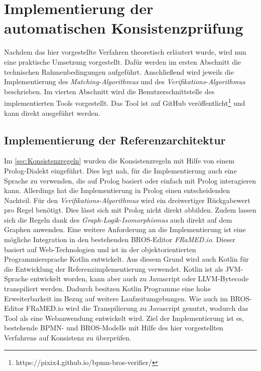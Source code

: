\chapter{Implementierung der automatischen Konsistenzprüfung}
\label{chap:implementation}

Nachdem das hier vorgestellte Verfahren theoretisch erläutert wurde, wird nun eine praktische Umsetzung vorgestellt.
Dafür werden im ersten Abschnitt die technischen Rahmenbedingungen aufgeführt.
Anschließend wird jeweils die Implementierung des \emph{Matching-Algorithmus} und des \emph{Verifikations-Algorithmus} beschrieben.
Im vierten Abschnitt wird die Benutzerschnittstelle des implementierten Tools vorgestellt.
Das Tool ist auf GitHub veröffentlicht\footnote{https://pixix4.github.io/bpmn-bros-verifier/} und kann direkt ausgeführt werden.

\section{Implementierung der Referenzarchitektur}

Im \cref{sec:Konsistenzregeln} wurden die Konsistenzregeln mit Hilfe von einem Prolog-Dialekt eingeführt.
Dies legt nah, für die Implementierung auch eine Sprache zu verwenden, die auf Prolog basiert oder einfach mit Prolog interagieren kann.
Allerdings hat die Implementierung in Prolog einen entscheidenden Nachteil.
Für den \emph{Verifikations-Algorithmus} wird ein dreiwertiger Rückgabewert pro Regel benötigt.
Dies lässt sich mit Prolog nicht direkt abbilden.
Zudem lassen sich die Regeln dank des \emph{Graph-Logik-Isomorphismus} auch direkt auf dem Graphen anwenden.
Eine weitere Anforderung an die Implementierung ist eine mögliche Integration in den bestehenden BROS-Editor \emph{FRaMED.io}.
Dieser basiert auf Web-Technologien und ist in der objektorientierten Programmiersprache Kotlin entwickelt.
Aus diesem Grund wird auch Kotlin für die Entwicklung der Referenzimplementierung verwendet.
Kotlin ist als JVM-Sprache entwickelt worden, kann aber auch zu Javascript oder LLVM-Bytecode transpiliert werden.
Dadurch besitzen Kotlin Programme eine hohe Erweiterbarkeit im Bezug auf weitere Laufzeitumgebungen.
Wie auch im BROS-Editor FRaMED.io wird die Transpilierung zu Javascript genutzt, wodurch das Tool als eine Webanwendung entwickelt wird.
Ziel der Implementierung ist es, bestehende BPMN- und BROS-Modelle mit Hilfe des hier vorgestellten Verfahrens auf Konsistenz zu überprüfen.

